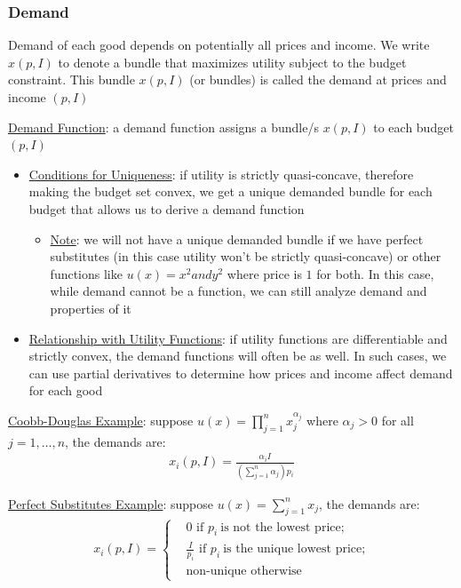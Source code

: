 \documentclass{article}
\begin{document}
\subsubsection{Demand}
Demand of each good depends on potentially all prices and income. We write $x(p,I)$ to denote a bundle that maximizes utility subject to the budget constraint. This bundle $x(p,I)$ (or bundles) is called the demand at prices and income $(p, I)$  \par \vspace{0.3em}
  \underline{Demand Function}: a demand function assigns a bundle/s $x(p, I)$ to each budget $(p,I)$
  \begin{itemize}
    \item  \underline{Conditions for Uniqueness}: if utility is strictly quasi-concave, therefore making the budget set convex, we get a unique demanded bundle for each budget that allows us to derive a demand function
    \begin{itemize}
      \item  \underline{Note}: we will not have a unique demanded bundle if we have perfect substitutes (in this case utility won't be strictly quasi-concave) or other functions like $u(x) = x^{2} and y^{2}$ where price is $1$ for both. In this case, while demand cannot be a function, we can still analyze demand and properties of it
    \end{itemize}
    \item  \underline{Relationship with Utility Functions}: if utility functions are differentiable and strictly convex, the demand functions will often be as well. In such cases, we can use partial derivatives to determine how prices and income affect demand for each good
  \end{itemize}
  \par
  \underline{Coobb-Douglas Example}: suppose $u(x) = \prod_{j=1}^{n} x_{j}^{\alpha_{j}}$ where $\alpha_{j} > 0$ for all $j = 1, \dots, n$, the demands are:
  \begin{gather*}
    x_{i}(p,I) = \frac{\alpha_{i} I}{(\sum_{j=1}^{n}\alpha_{j})p_{i}}
  \end{gather*}
  \par
  \underline{Perfect Substitutes Example}: suppose $u(x) = \sum_{j=1}^{n}  x_{j}$, the demands are:
  \begin{gather*}
    x_{i}(p,I) =
    \begin{cases}
     & 0 \text{ if } p_{i} \ \text{is not the lowest price;} \\
     & \tfrac{I}{p_{i}} \text{ if } p_{i} \ \text{is the unique lowest price;} \\
     & \text{non-unique otherwise}
    \end{cases}
  \end{gather*}
\end{document}
